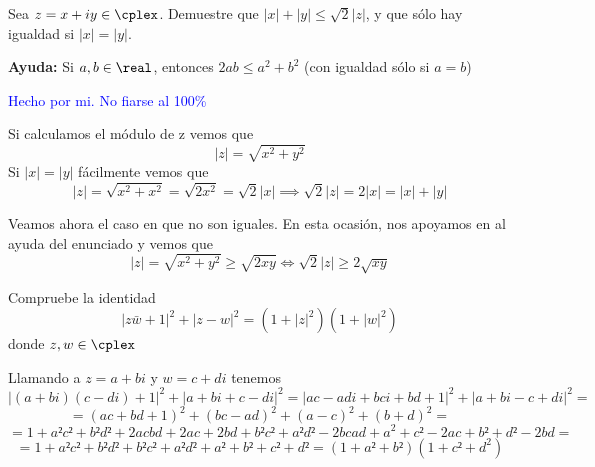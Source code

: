 \begin{problem}[3]
Sea $z=x+iy \in \cplex$. Demuestre que $|x|+|y|\leq \sqrt{2}|z|$, y que sólo hay igualdad si $|x|=|y|$.

\textbf{Ayuda:} Si $a,b \in \real$, entonces $2ab \leq a^2 + b^2$ (con igualdad sólo si $a=b$)

\solution

\textcolor{blue}{Hecho por mi. No fiarse al 100\%}

Si calculamos el módulo de z vemos que
\[|z|=\sqrt{x^2+y^2}\]
Si $|x|=|y|$ fácilmente vemos que
\[|z|=\sqrt{x^2+x^2}=\sqrt{2x^2}=\sqrt{2}|x| \implies \sqrt{2}|z|=2|x|=|x|+|y|\]

Veamos ahora el caso en que no son iguales. En esta ocasión, nos apoyamos en al ayuda del enunciado y vemos que
\[|z|=\sqrt{x^2+y^2} \geq \sqrt{2xy} \iff \sqrt{2}|z| \geq 2\sqrt{xy}\]


\end{problem}

\begin{problem}[4]
Compruebe la identidad
\[|z\bar{w}+1|^2+|z-w|^2 = (1+|z|^2)(1+|w|^2)\]
donde $z,w \in \cplex$

\solution

Llamando a $z=a+bi$ y $w=c+di$ tenemos
\[|(a+bi)(c-di)+1|^2+|a+bi+c-di|^2=|ac-adi+bci+bd+1|^2+|a+bi-c+di|^2 = \]
\[=(ac+bd+1)^2+(bc-ad)^2+(a-c)^2+(b+d)^2 =\]
\[= 1 + a²c²+b²d²+2acbd + 2ac+2bd+b²c²+a²d²-2bcad+a^2+c²-2ac+b²+d²-2bd =\]
\[= 1+a²c²+b²d²+b²c²+a²d²+a²+b²+c²+d² = (1+a²+b²)(1+c²+d^2)\]

\end{problem}

